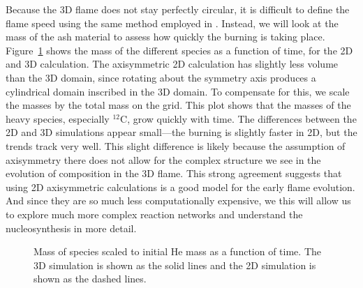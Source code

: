 \documentclass[twocolumn,times,tighten]{aastex631}
\newcommand{\isot}[2]{$^{#2}\mathrm{#1}$}
\begin{document}
\begin{figure*}[t]
\centering
{}
\caption{\label{fig:2d_abar} Time-sequence of the two-dimensional axisymmetric
simualtion using the same setup as the three-dimensional simulation shown
in Figure~\ref{fig:vr_abar}.  The domain is zoomed in, showing only the left
two-thirds of the surface.}
\end{figure*}




Because the 3D flame does not stay perfectly circular, it is difficult
to define the flame speed using the same method employed in
\citet{eiden:2020}.  Instead, we will look at the mass of the ash
material to assess how quickly the burning is taking place.
Figure~\ref{fig:mass_plot} shows the mass of the different species as
a function of time, for the 2D and 3D calculation.  The axisymmetric
2D calculation has slightly less volume than the 3D domain, since
rotating about the symmetry axis produces a cylindrical domain
inscribed in the 3D domain.  To compensate for this, we scale the
masses by the total mass on the grid.  This plot shows that the
masses of the heavy species, especially \isot{C}{12}, grow quickly
with time.  The differences between the 2D and 3D simulations appear
small---the burning is slightly faster in 2D, but the trends track
very well.  This slight difference is likely because the assumption of
axisymmetry there does not allow for the complex structure we see in
the evolution of composition in the 3D flame.  This strong agreement
suggests that using 2D axisymmetric calculations is a good model for
the early flame evolution.  And since they are so much less
computationally expensive, we this will allow us to explore much more
complex reaction networks and understand the nucleosynthesis in more
detail.

\begin{figure}[t]
\centering
{}
\caption{\label{fig:mass_plot} Mass of species scaled to initial He
  mass as a function of time.  The 3D simulation is shown as the solid
  lines and the 2D simulation is shown as the dashed lines.}
\end{figure}
\end{document}
